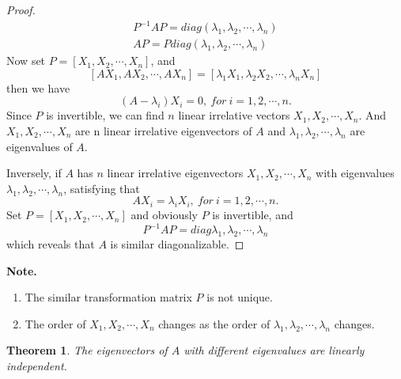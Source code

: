 \documentclass{article}
\newtheorem{theorem}{Theorem}[section]
\theoremstyle{definition}
\begin{document}
\begin{proof}
\begin{align*}
P^{-1}AP=diag(\lambda_{1},\lambda_{2},\cdots,\lambda_{n})\\
AP=Pdiag(\lambda_{1},\lambda_{2},\cdots,\lambda_{n})
\end{align*}
Now set $P=[X_{1},X_{2},\cdots,X_{n}]$, and 
$$[AX_{1},AX_{2},\cdots,AX_{n}]=[\lambda_{1}X_{1},\lambda_{2}X_{2},\cdots,\lambda_{n}X_{n}]$$
then we have $$(A-\lambda_{i})X_{i}=0,\ for\ i=1,2,\cdots,n.$$
Since $P$ is invertible, we can find $n$ linear irrelative vectors $X_{1},X_{2},\cdots,X_{n}$.
And $X_{1},X_{2},\cdots,X_{n}$ are n linear irrelative eigenvectors of $A$ and $\lambda_{1},\lambda_{2},\cdots,\lambda_{n}$ are 
eigenvalues of $A$.

Inversely, if $A$ has $n$ linear irrelative eigenvectors $X_{1},X_{2},\cdots,X_{n}$ with eigenvalues $\lambda_{1},\lambda_{2},\cdots,\lambda_{n}$,
satisfying that 
$$AX_{i}=\lambda_{i}X_{i},\ for\ i=1,2,\cdots,n.$$
Set $P=[X_{1},X_{2},\cdots,X_{n}]$ and obviously $P$ is invertible, and 
$$P^{-1}AP=diag{\lambda_{1},\lambda_{2},\cdots,\lambda_{n}}$$
which reveals that $A$ is similar diagonalizable.
\end{proof}

\textbf{Note.}
\begin{enumerate}
\item The similar transformation matrix $P$ is not unique.
\item The order of $X_{1},X_{2},\cdots,X_{n}$ changes as the order of $\lambda_{1},\lambda_{2},\cdots,\lambda_{n}$ changes.
\end{enumerate}


\begin{theorem}
The eigenvectors of $A$ with different eigenvalues are linearly independent.
\end{theorem}
\end{document}
